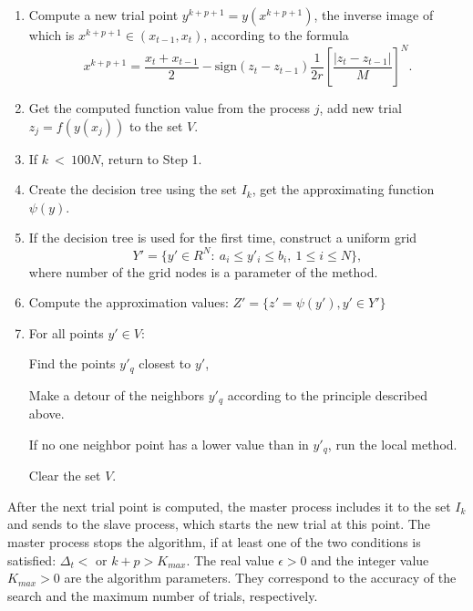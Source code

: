 \documentclass{cmi}
\begin{document}
\begin{enumerate}
	
	\item Compute a new trial point $y^{k+p+1}=y\left(x^{k+p+1}\right)$, the inverse image of which is  $x^{k+p+1}\in\left(x_{t-1},x_t\right)$, according to the formula 
	\begin{displaymath}
		x^{k+p+1}=\frac{x_t+x_{t-1}}{2}-\mathrm{sign}\left(z_t-z_{t-1}\right)\frac{1}{2r}\left[\frac{\left|z_t-z_{t-1}\right|}{M}\right]^N.
	\end{displaymath}
	
	
	\item Get the computed function value from the process $j$, add new trial $z_j = f(y(x_j))$ to the set  $V$. 
	
	
	\item If $k\ <\ 100 N$, return to Step 1.
	
	
	\item Create the decision tree using the set $I_k$, get the approximating function $\psi(y)$.
	
	\item If the decision tree is used for the first time, construct a uniform grid
	\begin{displaymath} 
		Y'=\{ y'\in R^N:\ a_i\le y'_i \le b_i,\ 1\le i\le N \},
	\end{displaymath} 
	where number of the grid nodes is a parameter of the method.
	
	\item Compute the approximation values: $Z' = \{ z'=  \psi(y'), y' \in Y'\}$
	
	\item For all points $y'\in V$:
	
	Find the points $y'_q$ closest to $y'$,
	
	Make a detour of the neighbors $y'_q$ according to the principle described above.
	
	If no one neighbor point has a lower value than in $y'_q$, run the local method.
	
	Clear the set $V$.
	
\end{enumerate}

After the next trial point is computed, the master process includes it to the set $I_k$ and sends to the  slave process, which starts the new trial at this point. The master process stops the algorithm, if at least one of the two conditions is satisfied: $\Delta_t<$ or  $k+p>K_{max}$. The real value $\epsilon>0$ and the integer value $K_{max}>0$ are the algorithm parameters. They correspond to the accuracy of the search and the maximum number of trials, respectively.
\end{document}
